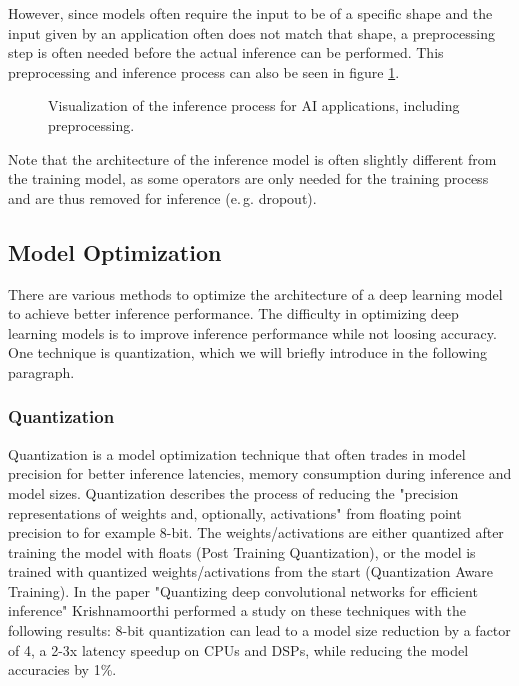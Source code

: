 However, since models often require the input to be of a specific shape and the input given by an application often does not match that shape, a preprocessing step is often needed before the actual inference can be performed.
This preprocessing and inference process can also be seen in figure \ref{fig:InfProcess}.
\begin{figure}[H]
\centering

\caption{Visualization of the inference process for AI applications, including preprocessing.}
\label{fig:InfProcess}
\end{figure}
Note that the architecture of the inference model is often slightly different from the training model, as some operators are only needed for the training process and are thus removed for inference (e.\,g. dropout).





\subsection{Model Optimization}
There are various methods to optimize the architecture of a deep learning model to achieve better inference performance.
The difficulty in optimizing deep learning models is to improve inference performance while not loosing accuracy.
One technique is quantization, which we will briefly introduce in the following paragraph.
\subsubsection{Quantization}
\label{chap:quant}
Quantization is a model optimization technique that often trades in model precision for better inference latencies, memory consumption during inference and model sizes.
Quantization describes the process of reducing the "precision representations of weights and, optionally, activations" \cite{tfLiteQuant} from floating point precision to for example 8-bit.
The weights/activations are either quantized after training the model with floats (Post Training Quantization), or the model is trained with quantized weights/activations from the start (Quantization Aware Training). In the paper "Quantizing deep convolutional networks for
efficient inference"\cite{Quantizing} Krishnamoorthi performed a study on these techniques with the following results:
8-bit quantization can lead to a model size reduction by a factor of 4, a 2-3x latency speedup on CPUs and DSPs, while reducing the model accuracies by 1\%.


